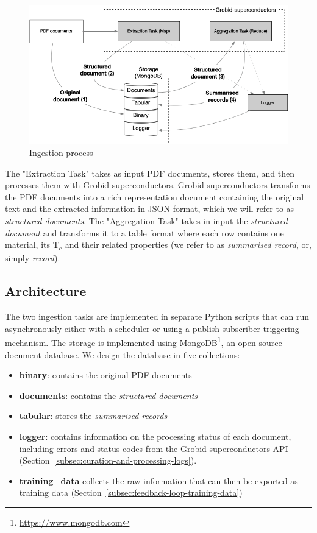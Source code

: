 \documentclass[a4paper]{article}
\begin{document}
\begin{figure}[ht]
  \centering
  \includegraphics[width=\textwidth]{images/ingestion-schema.png} 
  \caption{Ingestion process}
  \label{fig:map-reduce}
\end{figure}

The "Extraction Task" takes as input PDF documents, stores them, and then processes them with Grobid-superconductors. 
Grobid-superconductors transforms the PDF documents into a rich representation document containing the original text and the extracted information in JSON format, which we will refer to as \textit{structured documents}.  
The "Aggregation Task" takes in input the \textit{structured document} and transforms it to a table format where each row contains one material, its T\textsubscript{c} and their related properties (we refer to as \textit{summarised record}, or, simply \textit{record}).

\subsection{Architecture}
\label{sec:architecture}

The two ingestion tasks are implemented in separate Python scripts that can run asynchronously either with a scheduler or using a publish-subscriber triggering mechanism. 
The storage is implemented using MongoDB\footnote{\url{https://www.mongodb.com}}, an open-source document database. 
We design the database in five collections: 
\begin{itemize}
    \item \textbf{binary}: contains the original PDF documents 
    \item \textbf{documents}: contains the \textit{structured documents}
    \item \textbf{tabular}: stores the \textit{summarised records}
    \item \textbf{logger}: contains information on the processing status of each document, including errors and status codes from the Grobid-superconductors API (Section~\ref{subsec:curation-and-processing-logs}).
    \item \textbf{training\_data} collects the raw information that can then be exported as training data (Section~\ref{subsec:feedback-loop-training-data})
\end{itemize}
\end{document}
